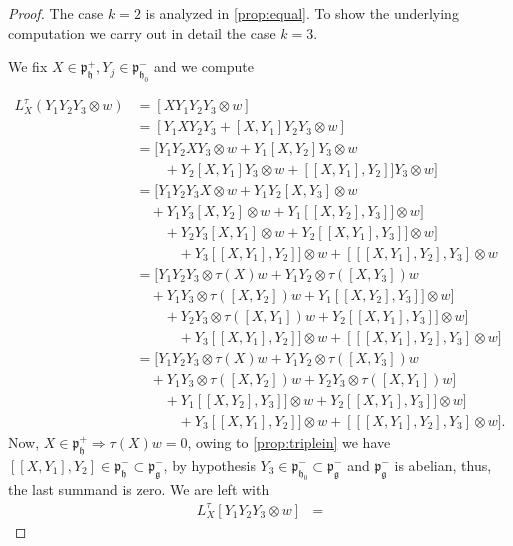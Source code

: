 \documentclass[12pt]{amsart}
\theoremstyle{definition}
\theoremstyle{remark}
\newcommand{\g}{\mathfrak{g}}
\newcommand{\h}{\mathfrak{h}}
\newcommand{\p}{\mathfrak p}
\numberwithin{equation}{section}
\begin{document}
\begin{proof}The case $k=2 $ is analyzed in \ref{prop:equal}. To show the underlying computation we carry out in detail the case $k=3$.

We fix
$ X \in \p_\h^+, Y_j \in \p_{\h_0}^-    $ and  we compute

\begin{equation*} \begin{split} L_X^\tau(Y_1Y_2Y_3\otimes w)& =[XY_1Y_2Y_3 \otimes w] \\ & = [Y_1XY_2Y_3 + [X,Y_1]Y_2Y_3 \otimes w ]
\\ & = [ Y_1Y_2XY_3\otimes w + Y_1[X,Y_2]Y_3\otimes w \\ & \quad \quad +Y_2[X,Y_1]Y_3\otimes w
+[[X,Y_1],Y_2]]Y_3 \otimes w ]
 \\ & = [ Y_1Y_2Y_3X\otimes w + Y_1Y_2[X,Y_3]\otimes w   \\ & \quad +Y_1Y_3[X,Y_2]\otimes w+Y_1 [[X,Y_2],Y_3]] \otimes w ]
 \\ & \quad \quad +Y_2Y_3[X,Y_1]\otimes w+Y_2 [[X,Y_1],Y_3]] \otimes w ]
 \\ & \quad \quad \quad + Y_3 [[X,Y_1],Y_2]] \otimes w + [[[X,Y_1],Y_2],Y_3 ]\otimes w
 \\ & = [ Y_1Y_2Y_3\otimes \tau(X) w + Y_1Y_2 \otimes \tau([X,Y_3]) w   \\ & \quad +Y_1Y_3\otimes \tau([X,Y_2]) w+Y_1 [[X,Y_2],Y_3]] \otimes w ]
 \\ & \quad \quad +Y_2Y_3 \otimes \tau([X,Y_1]) w+Y_2 [[X,Y_1],Y_3]] \otimes w ]
 \\ & \quad \quad \quad + Y_3 [[X,Y_1],Y_2]] \otimes w + [[[X,Y_1],Y_2],Y_3 ]\otimes w]
 \\ & = [ Y_1Y_2Y_3\otimes \tau(X) w + Y_1Y_2 \otimes \tau([X,Y_3]) w   \\ & \quad +Y_1Y_3\otimes \tau([X,Y_2]) w+ Y_2Y_3 \otimes \tau([X,Y_1])  w ]
 \\ & \quad \quad +Y_1 [[X,Y_2],Y_3]]  \otimes  w+Y_2 [[X,Y_1],Y_3]] \otimes w ]
 \\ & \quad \quad \quad + Y_3 [[X,Y_1],Y_2]] \otimes w + [[[X,Y_1],Y_2],Y_3 ]\otimes w].
 \end{split}
\end{equation*}
Now,  $X \in \p_\h^+ \Rightarrow \tau(X)w=0$, owing to \ref{prop:triplein} we have $[[X,Y_1],Y_2] \in \p_\h^- \subset \p_\g^-$, by hypothesis $Y_3 \in  \p_{\h_0}^- \subset \p_\g^-$ and $\p_\g^-$ is abelian, thus, the last summand is zero.
We are left with
\begin{equation} \label{eq:triple}\begin{split} L_X^\tau[Y_1Y_2Y_3\otimes w]& =

\end{split}
\end{equation}
\end{proof}
\end{document}
